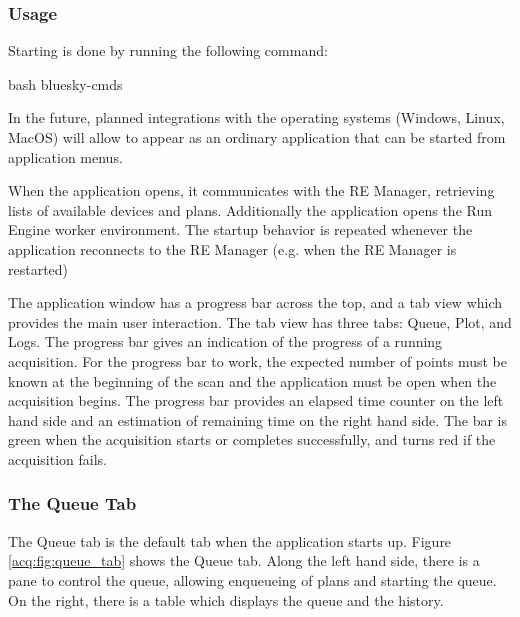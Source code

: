 \subsubsection{Usage}


Starting \blueskycmds is done by running the following command:

\begin{codefragment}{bash}
bluesky-cmds
\end{codefragment}

In the future, planned integrations with the operating systems (Windows, Linux, MacOS) will allow \blueskycmds to appear as an ordinary application that can be started from application menus.

When the application opens, it communicates with the RE Manager, retrieving lists of available devices and plans.
Additionally the application opens the Run Engine worker environment.
The startup behavior is repeated whenever the application reconnects to the RE Manager (e.g. when the RE Manager is restarted)

The application window has a progress bar across the top, and a tab view which provides the main user interaction.
The tab view has three tabs: Queue, Plot, and Logs.
The progress bar gives an indication of the progress of a running acquisition.
For the progress bar to work, the expected number of points must be known at the beginning of the scan and the application must be open when the acquisition begins.
The progress bar provides an elapsed time counter on the left hand side and an estimation of remaining time on the right hand side.
The bar is green when the acquisition starts or completes successfully, and turns red if the acquisition fails.

\subsubsection{The Queue Tab}

The Queue tab is the default tab when the application starts up.
Figure \ref{acq:fig:queue_tab} shows the Queue tab.
Along the left hand side, there is a pane to control the queue, allowing enqueueing of plans and starting the queue.
On the right, there is a table which displays the queue and the history.

